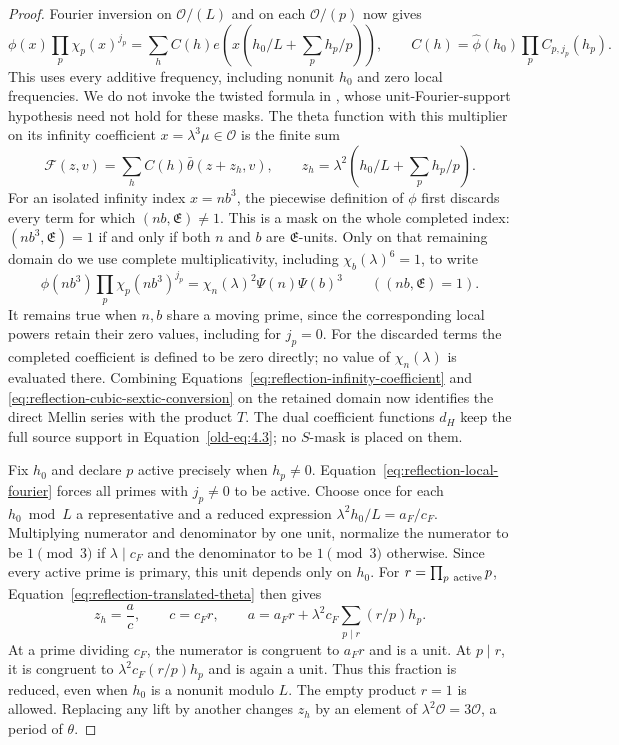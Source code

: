 \documentclass[11pt,a4paper]{article}
\numberwithin{equation}{section}
\numberwithin{figure}{section}
\theoremstyle{definition}
\theoremstyle{remark}
\begin{document}
\begin{proof}
Fourier inversion on $\mathcal O/(L)$ and on each $\mathcal O/(p)$
now gives
\[
 \phi(x)\prod_p\chi_p(x)^{j_p}
  =\sum_h C(h)e\!\left(x\left(h_0/L+\sum_p h_p/p\right)\right),
 \qquad C(h)=\widehat\phi(h_0)\prod_pC_{p,j_p}(h_p).
\]
This uses every additive frequency, including nonunit $h_0$ and zero local
frequencies.  We do not invoke the twisted formula in
\cite[Lemma~5.2 and Corollary~5.1]{DR}, whose unit-Fourier-support hypothesis
need not hold for these masks.  The theta function with this multiplier on
its infinity coefficient $x=\lambda^3\mu\in\mathcal O$ is the finite sum
\begin{equation}\label{eq:reflection-translated-theta}
 \mathcal F(z,v)=\sum_hC(h)\bar\theta(z+z_h,v),\qquad
 z_h=\lambda^2\left(h_0/L+\sum_p h_p/p\right).
\end{equation}
For an isolated infinity index $x=nb^3$, the piecewise definition of $\phi$
first discards every term for which $(nb,\mathfrak E)\ne1$.  This is a mask on
the whole completed index: $(nb^3,\mathfrak E)=1$ if and only if both $n$
and $b$ are $\mathfrak E$-units.  Only on that remaining domain do we use
complete multiplicativity, including $\chi_b(\lambda)^6=1$, to write
\[
 \phi(nb^3)\prod_p\chi_p(nb^3)^{j_p}
 =\chi_n(\lambda)^2\Psi(n)\Psi(b)^3
 \qquad((nb,\mathfrak E)=1).
\]
It remains true when $n,b$ share a moving prime, since the corresponding
local powers retain their zero values, including for $j_p=0$.  For the
discarded terms the completed coefficient is defined to be zero directly;
no value of $\chi_n(\lambda)$ is evaluated there.  Combining
Equations~\eqref{eq:reflection-infinity-coefficient} and
\eqref{eq:reflection-cubic-sextic-conversion} on the retained domain now
identifies the direct Mellin series with the product $T$.  The dual coefficient
functions $d_H$ keep the full source support in Equation~\eqref{old-eq:4.3};
no $S$-mask is placed on them.

Fix $h_0$ and declare $p$ active precisely when $h_p\ne0$.
Equation~\eqref{eq:reflection-local-fourier} forces all primes with
$j_p\ne0$ to be active.  Choose once for each $h_0\bmod L$ a representative
and a reduced expression
$\lambda^2h_0/L=a_F/c_F$.  Multiplying numerator and denominator by
one unit, normalize the numerator to be $1\pmod3$ if $\lambda\mid c_F$
and the denominator to be $1\pmod3$ otherwise.  Since every active
prime is primary, this unit depends only on $h_0$.
For $r=\prod_{p\ {\rm active}}p$, Equation~\eqref{eq:reflection-translated-theta}
then gives
\begin{equation}\label{eq:reflection-cusp-fraction}
 z_h=\frac ac,\qquad c=c_Fr,\qquad
 a=a_Fr+\lambda^2c_F\sum_{p\mid r}(r/p)h_p.
\end{equation}
At a prime dividing $c_F$, the numerator is congruent to $a_Fr$ and is
a unit.  At $p\mid r$, it is congruent to
$\lambda^2c_F(r/p)h_p$ and is again a unit.  Thus this fraction is
reduced, even when $h_0$ is a nonunit modulo $L$.  The empty product
$r=1$ is allowed.  Replacing any lift by another changes $z_h$ by an
element of $\lambda^2\mathcal O=3\mathcal O$, a period of $\theta$.


\end{proof}
\end{document}
